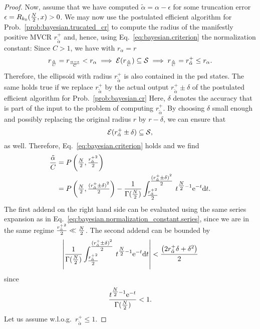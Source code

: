 \begin{proof}
  Now, assume that we have computed $\tilde\alpha = \alpha-\epsilon$ for some truncation error $\epsilon = R_{k_0}(\tfrac{N}{2},x) > 0$.
  We may now use the postulated efficient algorithm for Prob.~\ref{prob:bayesian.trucated_cr} to compute the radius of the manifestly positive MVCR $r^+_{\tilde\alpha}$ and, hence, using Eq.~\eqref{eq:bayesian.criterion} the normalization constant:
  Since $C>1$, we have with $r_{\alpha} = r$
  \[
    r_\frac{\tilde\alpha}{C} = r_\frac{\alpha-\epsilon}{C} < r_{\alpha} \implies \mathcal{E}(r_\frac{\tilde\alpha}{C}) \subseteq \mathcal{S} \implies r_\frac{\tilde\alpha}{C} = r^+_{\tilde\alpha} \le r_{\alpha}.
  \]
  Therefore, the ellipsoid with radius $r^+_{\tilde\alpha}$ is also contained in the psd states.
  The same holds true if we replace $r^+_{\tilde\alpha}$ by the actual output $r^+_{\tilde\alpha} \pm \delta$ of the postulated efficient algorithm for Prob.~\ref{prob:bayesian.cr}
  Here, $\delta$ denotes the accuracy that is part of the input to the problem of computing $r^+_{\tilde\alpha}$.
  By choosing $\delta$ small enough and possibly replacing the original radius $r$ by $r - \delta$, we can ensure that
  \[
    \label{eq:bayesian.normalization_constant.small_enough_r}
    \mathcal{E}(r^+_{\tilde\alpha} \pm \delta) \subseteq \mathcal{S},
  \]
  as well.
  Therefore, Eq.~\eqref{eq:bayesian.criterion} holds and we find
  \begin{align}
    \label{eq:bayesian.normalization_constant.almost_c}
    \frac{\tilde\alpha}{C}
    &= P\left( \tfrac{N}{2}, \tfrac{{r^+_{\tilde\alpha}}^2}{2} \right) \\
    &= P\left( \tfrac{N}{2}, \tfrac{{(r^+_{\tilde\alpha} \pm \delta)}^2}{2} \right) - \frac{1}{\Gamma(\tfrac{N}{2})} \int_{\tfrac{{r^+_{\tilde\alpha}}^2}{2}}^{\tfrac{{(r^+_{\tilde\alpha} \pm \delta)}^2}{2}}\, t^{\tfrac{N}{2} - 1} \mathrm{e}^{-t} \mathrm{d} t.
  \end{align}
  The first addend on the right hand side can be evaluated using the same series expansion as in Eq.~\eqref{eq:bayesian.normalization_constant.series}, since we are in the same regime $\tfrac{{r^+_{\tilde\alpha}}^2}{2} \ll \tfrac{N}{2}$.
  The second addend can be bounded by
  \[
    \label{eq:bayesian.normalization_constant.upper_bound}
    {\left\vert\frac{1}{\Gamma(\tfrac{N}{2})} \int_{\tfrac{{r^+_{\tilde\alpha}}^2}{2}}^{\tfrac{{(r^+_{\tilde\alpha} \pm \delta)}^2}{2}}\, t^{\tfrac{N}{2}- 1} \mathrm{e}^{-t} \mathrm{d}t\right\vert}
    < \frac{\left( 2 {r^+_{\tilde\alpha}} \delta + \delta^2 \right)}{2}
  \]
  since
  \[
    \frac{t^{\tfrac{N}{2} - 1} \mathrm{e}^{-t}}{\Gamma(\tfrac{N}{2})} < 1.
  \]
  Let us assume w.l.o.g.\ $r^+_{\tilde\alpha} \le 1$.

\end{proof}
